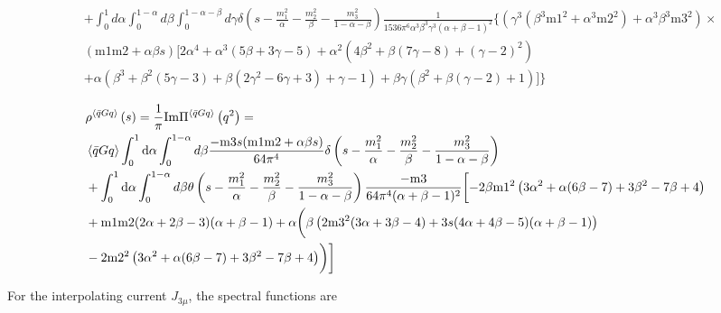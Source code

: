 \documentclass[prd,showpacs,showkeys,floatfix,amsmath,amssymb,floatfix,english]{revtex4}
\begin{document}
{\begin{align}
 & +\int_{0}^{1}d\alpha\int_{0}^{1-\alpha}d\beta\int_{0}^{1-\alpha-\beta}d\gamma\delta\left(s-\frac{m_{1}^{2}}{\alpha}-\frac{m_{2}^{2}}{\beta}-\frac{m_{3}^{2}}{1-\alpha-\beta}\right)\frac{1}{1536\pi^{6}\alpha^{3}\beta^{3}\gamma^{3}(\alpha+\beta-1)^{2}}\biggl\{\left(\gamma^{3}\left(\beta^{3}\text{m1}^{2}+\alpha^{3}\text{m2}^{2}\right)+\alpha^{3}\beta^{3}\text{m3}^{2}\right)\times\nonumber \\
 & \left(\text{m1}\text{m2}+\alpha\beta s\right)\biggl[2\alpha^{4}+\alpha^{3}(5\beta+3\gamma-5)+\alpha^{2}\left(4\beta^{2}+\beta(7\gamma-8)+(\gamma-2)^{2}\right)\nonumber \\
 & +\alpha\left(\beta^{3}+\beta^{2}(5\gamma-3)+\beta\left(2\gamma^{2}-6\gamma+3\right)+\gamma-1\right)+\beta\gamma\left(\beta^{2}+\beta(\gamma-2)+1\right)\biggr]\biggr\}
\end{align}
}{\tiny \par}

{\scriptsize{}
\begin{align}
 & \rho^{\left\langle \bar{q}Gq\right\rangle }\left(s\right)=\frac{1}{\pi}\mathrm{Im}\Pi^{\left\langle \bar{q}Gq\right\rangle }\left(q^{2}\right)=\nonumber \\
 & \left\langle \bar{q}Gq\right\rangle \int_{0}^{1}{\rm d}\alpha\int_{0}^{1-\alpha}d\beta\frac{-\text{m3}s(\text{m1}\text{m2}+\alpha\beta s)}{64\pi^{4}}\delta\left(s-\frac{m_{1}^{2}}{\alpha}-\frac{m_{2}^{2}}{\beta}-\frac{m_{3}^{2}}{1-\alpha-\beta}\right)\nonumber \\
 & +\int_{0}^{1}{\rm d}\alpha\int_{0}^{1-\alpha}d\beta\theta\left(s-\frac{m_{1}^{2}}{\alpha}-\frac{m_{2}^{2}}{\beta}-\frac{m_{3}^{2}}{1-\alpha-\beta}\right)\frac{-\text{m3}}{64\pi^{4}(\alpha+\beta-1)^{2}}\biggl[-2\beta\text{m1}^{2}\left(3\alpha^{2}+\alpha(6\beta-7)+3\beta^{2}-7\beta+4\right)\nonumber \\
 & +\text{m1}\text{m2}(2\alpha+2\beta-3)(\alpha+\beta-1)+\alpha\biggl(\beta\left(2\text{m3}^{2}(3\alpha+3\beta-4)+3s(4\alpha+4\beta-5)(\alpha+\beta-1)\right)\nonumber \\
 & -2\text{m2}^{2}\left(3\alpha^{2}+\alpha(6\beta-7)+3\beta^{2}-7\beta+4\right)\biggr)\biggr]
\end{align}
}

For the interpolating current $J_{3\mu}$, the spectral functions are
\end{document}
